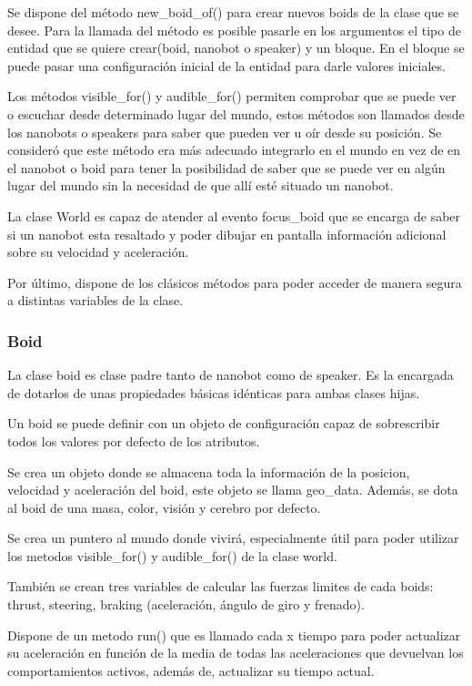 Se dispone del método new\_boid\_of() para crear nuevos boids de la clase que se desee. Para la llamada del método es posible pasarle en los argumentos el tipo de entidad que se quiere crear(boid, nanobot o speaker) y un bloque. En el bloque se puede pasar una configuración inicial de la entidad para darle valores iniciales.

Los métodos visible\_for() y audible\_for() permiten comprobar que se puede ver o escuchar desde determinado lugar del mundo, estos métodos son llamados desde los nanobots o speakers para saber que pueden ver u oír desde su posición. Se consideró que este método era más adecuado integrarlo en el mundo en vez de en el nanobot o boid para tener la posibilidad de saber que se puede ver en algún lugar del mundo sin la necesidad de que allí esté situado un nanobot.

La clase World es capaz de atender al evento focus\_boid que se encarga de saber si un nanobot esta resaltado y poder dibujar en pantalla información adicional sobre su velocidad y aceleración.

Por último, dispone de los clásicos métodos para poder acceder de manera segura a distintas variables de la clase.

\subsubsection{Boid}
\label{sec:boid}
La clase boid es clase padre tanto de nanobot como de speaker. Es la encargada de dotarlos de unas propiedades básicas idénticas para ambas clases hijas.
 
Un boid se puede definir con un objeto de configuración capaz de sobrescribir todos los  valores por defecto de los atributos.

Se crea un objeto donde se almacena toda la información de la posicion, velocidad y aceleración del boid, este objeto se llama geo\_data. Además, se dota al boid de una masa, color, visión y cerebro por defecto.
 
Se crea un puntero al mundo donde vivirá, especialmente útil para poder utilizar los metodos visible\_for() y audible\_for() de la clase world.

También se crean tres variables de calcular las fuerzas limites de cada boids: thrust, steering, braking (aceleración, ángulo de giro y frenado).
 
Dispone de un metodo run() que es llamado cada x tiempo para poder actualizar su aceleración en función de la media de todas las aceleraciones que devuelvan los comportamientos activos, además de, actualizar su tiempo actual.
 
